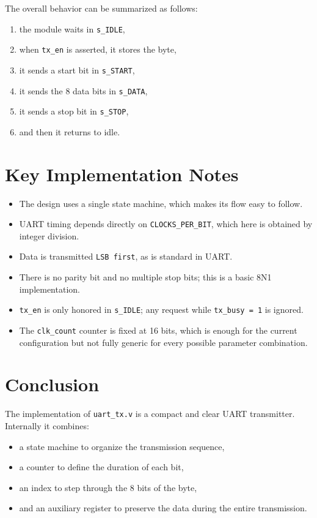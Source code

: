\documentclass[12pt]{article}
\begin{document}
The overall behavior can be summarized as follows:

\begin{enumerate}
    \item the module waits in \texttt{s\_IDLE},
    \item when \texttt{tx\_en} is asserted, it stores the byte,
    \item it sends a start bit in \texttt{s\_START},
    \item it sends the 8 data bits in \texttt{s\_DATA},
    \item it sends a stop bit in \texttt{s\_STOP},
    \item and then it returns to idle.
\end{enumerate}

\section{Key Implementation Notes}

\begin{itemize}
    \item The design uses a single state machine, which makes its flow easy to follow.
    \item UART timing depends directly on \texttt{CLOCKS\_PER\_BIT}, which here is obtained by integer division.
    \item Data is transmitted \texttt{LSB first}, as is standard in UART.
    \item There is no parity bit and no multiple stop bits; this is a basic 8N1 implementation.
    \item \texttt{tx\_en} is only honored in \texttt{s\_IDLE}; any request while \texttt{tx\_busy = 1} is ignored.
    \item The \texttt{clk\_count} counter is fixed at 16 bits, which is enough for the current configuration but not fully generic for every possible parameter combination.
\end{itemize}

\section{Conclusion}

The implementation of \texttt{uart\_tx.v} is a compact and clear UART transmitter. Internally it combines:

\begin{itemize}
    \item a state machine to organize the transmission sequence,
    \item a counter to define the duration of each bit,
    \item an index to step through the 8 bits of the byte,
    \item and an auxiliary register to preserve the data during the entire transmission.
\end{itemize}
\end{document}
